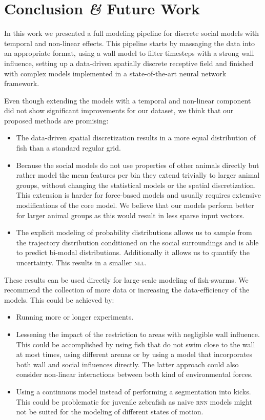 \documentclass[nobib, a4paper]{tufte-handout}
\begin{document}
\section{Conclusion \textit{\&} Future Work}
In this work we presented a full modeling pipeline for discrete social models with temporal and non-linear effects.
This pipeline starts by massaging the data into an appropriate format, using a wall model to filter timesteps with a strong wall influence, setting up a data-driven spatially discrete receptive field and finished with complex models implemented in a state-of-the-art neural network framework. 

Even though extending the models with a temporal and non-linear component did not show significant improvements for our dataset, we think that our proposed methods are promising:
\begin{itemize}
\item The data-driven spatial discretization results in a more equal distribution of fish than a standard regular grid.
\item Because the social models do not use properties of other animals directly but rather model the mean features per bin they extend trivially to larger animal groups, without changing the statistical models or the spatial discretization.
  This extension is harder for force-based models and usually requires extensive modifications of the core model.
  We believe that our models perform better for larger animal groups as this would result in less sparse input vectors.
\item The explicit modeling of probability distributions allows us to sample from the trajectory distribution conditioned on the social surroundings and is able to predict bi-modal distributions.
  Additionally it allows us to quantify the uncertainty.
  This results in a smaller \textsc{nll}.
\end{itemize}
These results can be used directly for large-scale modeling of fish-swarms.
We recommend the collection of more data or increasing the data-efficiency of the models.
This could be achieved by:
\begin{itemize}
\item Running more or longer experiments.
\item Lessening the impact of the restriction to areas with negligible wall influence.
  This could be accomplished by using fish that do not swim close to the wall at most times, using different arenas or by using a model that incorporates both wall and social influences directly.
  The latter approach could also consider non-linear interactions between both kind of environmental forces.
\item Using a continuous model instead of performing a segmentation into kicks.
  This could be problematic for juvenile zebrafish as naive \textsc{rnn} models might not be suited for the modeling of different states of motion.
\end{itemize}

\printbibliography
\end{document}
